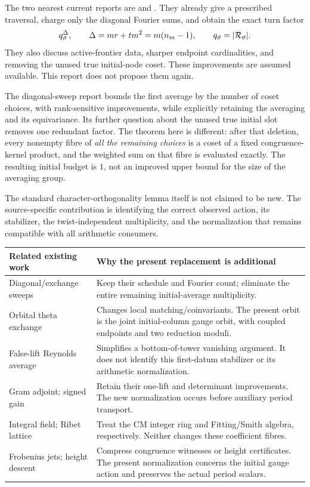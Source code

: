 The two nearest current reports are  and . They already give a prescribed traversal, charge only the diagonal Fourier sums, and obtain the exact turn factor
\begin{equation}\label{eq:knownturn}
 q_\vartheta^{\Delta},\qquad
 \Delta=mr+tm^2=m(n_m-1),
 \qquad q_\vartheta=\lvert \mathcal R_\vartheta\rvert.
\end{equation}
They also discuss active-frontier data, sharper endpoint cardinalities, and removing the unused true initial-node coset. These improvements are assumed available. This report does not propose them again.

The diagonal-sweep report bounds the first average by the number of coset choices, with rank-sensitive improvements, while explicitly retaining the averaging and its equivariance. Its further question about the unused true initial slot removes one redundant factor. The theorem here is different: after that deletion, every nonempty fibre of \emph{all the remaining choices} is a coset of a fixed congruence-kernel product, and the weighted sum on that fibre is evaluated exactly. The resulting initial budget is $1$, not an improved upper bound for the size of the averaging group.

The standard character-orthogonality lemma itself is not claimed to be new. The source-specific contribution is identifying the correct observed action, its stabilizer, the twist-independent multiplicity, and the normalization that remains compatible with all arithmetic consumers.

\begin{tabularx}{\linewidth}{@{}L{.31\linewidth}Y@{}}
\toprule
Related existing work & Why the present replacement is additional\\
\midrule
Diagonal/exchange sweeps & Keep their schedule and Fourier count; eliminate the entire remaining initial-average multiplicity.\\
Orbital theta exchange & Changes local matching/coinvariants. The present orbit is the joint initial-column gauge orbit, with coupled endpoints and two reduction moduli.\\
False-lift Reynolds average & Simplifies a bottom-of-tower vanishing argument. It does not identify this first-datum stabilizer or its arithmetic normalization.\\
Gram adjoint; signed gain & Retain their one-lift and determinant improvements. The new normalization occurs before auxiliary period transport.\\
Integral field; Ribet lattice & Treat the CM integer ring and Fitting/Smith algebra, respectively. Neither changes these coefficient fibres.\\
Frobenius jets; height descent & Compress congruence witnesses or height certificates. The present normalization concerns the initial gauge action and preserves the actual period scalars.\\
\bottomrule
\end{tabularx}

